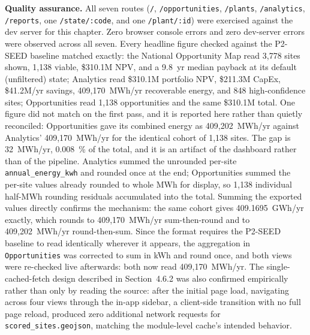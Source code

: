 \documentclass[12pt,letterpaper]{report}
\begin{document}
\textbf{Quality assurance.} All seven routes (\texttt{/},
\texttt{/opportunities}, \texttt{/plants}, \texttt{/analytics},
\texttt{/reports}, one \texttt{/state/:code}, and one \texttt{/plant/:id})
were exercised against the dev server for this chapter. Zero browser console
errors and zero dev-server errors were observed across all seven. Every
headline figure checked against the P2-SEED baseline matched exactly: the
National Opportunity Map read 3{,}778 sites shown, 1{,}138 viable,
\$310.1M NPV, and a 9.8~yr median payback at its default (unfiltered)
state; Analytics read \$310.1M portfolio NPV, \$211.3M CapEx,
\$41.2M/yr savings, 409{,}170~MWh/yr recoverable energy, and 848
high-confidence sites; Opportunities read 1{,}138 opportunities and the
same \$310.1M total. One figure did not match on the first pass, and it is
reported here rather than quietly reconciled: Opportunities gave its
combined energy as 409{,}202~MWh/yr against Analytics' 409{,}170~MWh/yr for
the identical cohort of 1{,}138 sites. The gap is 32~MWh/yr, 0.008~\% of the
total, and it is an artifact of the dashboard rather than of the pipeline.
Analytics summed the unrounded per-site \texttt{annual\_energy\_kwh} and
rounded once at the end; Opportunities summed the per-site values already
rounded to whole MWh for display, so 1{,}138 individual half-MWh rounding
residuals accumulated into the total. Summing the exported values directly
confirms the mechanism: the same cohort gives 409.1695~GWh/yr exactly,
which rounds to 409{,}170~MWh/yr sum-then-round and to 409{,}202~MWh/yr
round-then-sum. Since the format requires the P2-SEED baseline to read
identically wherever it appears, the aggregation in \texttt{Opportunities}
was corrected to sum in kWh and round once, and both views were re-checked
live afterwards: both now read 409{,}170~MWh/yr. The single-cached-fetch design
described in Section~4.6.2 was also confirmed empirically rather than
only by reading the source: after the initial page load, navigating
across four views through the in-app sidebar, a client-side transition
with no full page reload, produced zero additional network requests for
\texttt{scored\_sites.geojson}, matching the module-level cache's
intended behavior.
\end{document}
